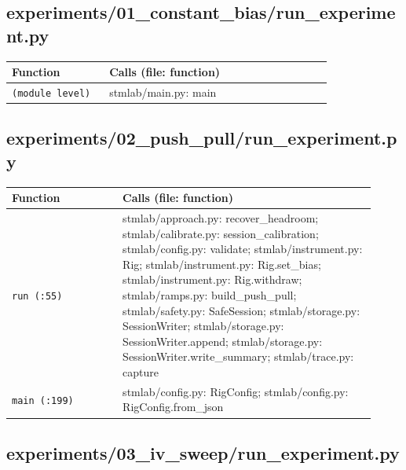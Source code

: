 \subsection{experiments/01\_constant\_bias/run\_experiment.py}

\small\setlength{\LTleft}{0pt}\setlength{\LTright}{\fill}
\begin{longtable}{@{}>{\raggedright\arraybackslash}p{0.280\linewidth}>{\raggedright\arraybackslash}p{0.640\linewidth}@{}}
\toprule
\textbf{Function} & \textbf{Calls (file: function)} \\
\midrule\endhead
\texttt{(module level)} & stmlab/main.py: main \\
\bottomrule
\end{longtable}
\normalsize

\subsection{experiments/02\_push\_pull/run\_experiment.py}

\small\setlength{\LTleft}{0pt}\setlength{\LTright}{\fill}
\begin{longtable}{@{}>{\raggedright\arraybackslash}p{0.280\linewidth}>{\raggedright\arraybackslash}p{0.640\linewidth}@{}}
\toprule
\textbf{Function} & \textbf{Calls (file: function)} \\
\midrule\endhead
\texttt{run (:55)} & stmlab/approach.py: recover\_headroom; stmlab/calibrate.py: session\_calibration; stmlab/config.py: validate; stmlab/instrument.py: Rig; stmlab/instrument.py: Rig.set\_bias; stmlab/instrument.py: Rig.withdraw; stmlab/ramps.py: build\_push\_pull; stmlab/safety.py: SafeSession; stmlab/storage.py: SessionWriter; stmlab/storage.py: SessionWriter.append; stmlab/storage.py: SessionWriter.write\_summary; stmlab/trace.py: capture \\
\texttt{main (:199)} & stmlab/config.py: RigConfig; stmlab/config.py: RigConfig.from\_json \\
\bottomrule
\end{longtable}
\normalsize

\subsection{experiments/03\_iv\_sweep/run\_experiment.py}

